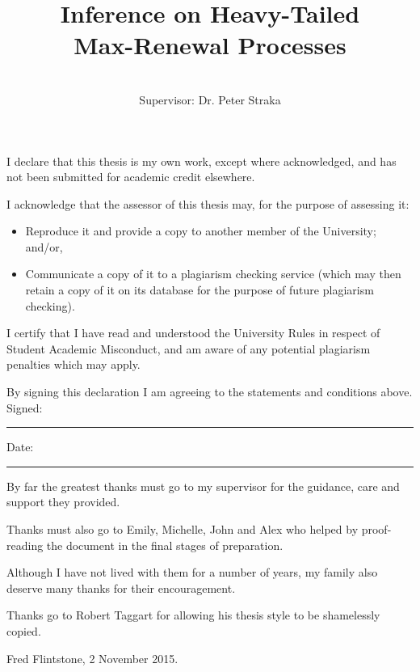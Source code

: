\documentclass[honours,12pt]{unswthesis}
\title{Inference on Heavy-Tailed\\ Max-Renewal Processes}
\author{\Authornameonly\\{\bigskip}Supervisor: Dr. Peter Straka}
\newcommand{\1}{\mathbf 1}
\newcommand\blankpage{%
    \null
    \thispagestyle{empty}%
    \addtocounter{page}{-1}%
    \newpage}
\numberwithin{equation}{section}
\theoremstyle{definition}
\theoremstyle{remark}
\begin{document}
\beforepreface

\afterpage{\blankpage}



\vskip 10pc \noindent I declare that this thesis is my
own work, except where acknowledged, and has not been submitted for
academic credit elsewhere. 

\vskip 2pc  \noindent I acknowledge that the assessor of this
thesis may, for the purpose of assessing it:
\begin{itemize}
\item Reproduce it and provide a copy to another member of the University; and/or,
\item Communicate a copy of it to a plagiarism checking service (which may then retain a copy of it on its database for the purpose of future plagiarism checking).
\end{itemize}

\vskip 2pc \noindent I certify that I have read and understood the University Rules in
respect of Student Academic Misconduct, and am aware of any potential plagiarism penalties which may 
apply.\vspace{24pt}

\vskip 2pc \noindent By signing 
this declaration I am
agreeing to the statements and conditions above.
\vskip 2pc \noindent
Signed: \rule{7cm}{0.25pt} \hfill Date: \rule{4cm}{0.25pt} \newline
\vskip 1pc

\afterpage{\blankpage}




{\bigskip}By far the greatest thanks must go to my supervisor for
the guidance, care and support they provided. 

{\bigskip\noindent}Thanks 
must also go to Emily, Michelle, John and Alex who helped by
proof-reading the document in the final stages of preparation.

{\bigskip\noindent}Although
I have not lived with them for a number of years, my family also deserve
many thanks for their encouragement.

{\bigskip\noindent} Thanks go to Robert Taggart for allowing his thesis
style to be shamelessly copied.

{\bigskip\bigskip\bigskip\noindent} Fred Flintstone, 2 November 2015.

\afterpage{\blankpage}
\end{document}
